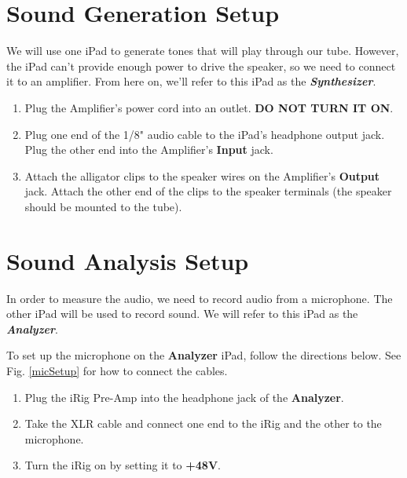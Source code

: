 \documentclass[12pt]{article}
\begin{document}
\section{Sound Generation Setup}
We will use one iPad to generate tones that will play through our tube. However, the iPad can't provide enough power to drive the speaker, so we need to connect it to an amplifier. From here on, we'll refer to this iPad as the \emph{\textbf{Synthesizer}}.

\begin{enumerate}
\item Plug the Amplifier's power cord into an outlet. \textbf{DO NOT TURN IT ON}.
\item Plug one end of the 1/8" audio cable to the iPad's headphone output jack. Plug the other end into the Amplifier's \textbf{Input} jack.
\item Attach the alligator clips to the speaker wires on the Amplifier's \textbf{Output} jack. Attach the other end of the clips to the speaker terminals (the speaker should be mounted to the tube).
\end{enumerate}

\section{Sound Analysis Setup} 
In order to measure the audio, we need to record audio from a microphone. The other iPad will be used to record sound. We will refer to this iPad as the \emph{\textbf{Analyzer}}.

To set up the microphone on the \textbf{Analyzer} iPad, follow the directions below. See Fig. \ref{micSetup} for how to connect the cables.

\begin{enumerate}
 \item Plug the iRig Pre-Amp into the headphone jack of the \textbf{Analyzer}.
 \item Take the XLR cable and connect one end to the iRig and the other to the microphone.
 \item Turn the iRig on by setting it to \textbf{+48V}.
 
\end{enumerate} 
\end{document}
